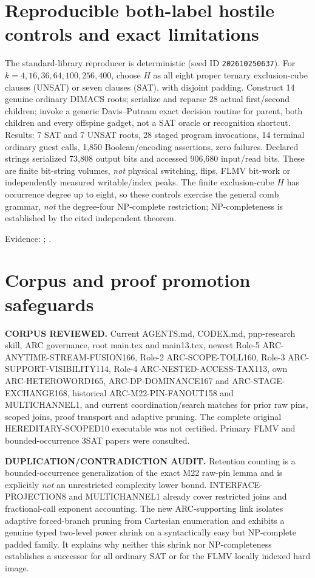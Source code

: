 \documentclass[11pt]{article}
\begin{document}
\section{Reproducible both-label hostile controls and exact limitations}
The standard-library reproducer is deterministic (seed ID \texttt{202610250637}). For $k=4,16,36,64,100,256,400$, choose $H$ as all eight proper ternary exclusion-cube clauses (UNSAT) or seven clauses (SAT), with disjoint padding. Construct 14 genuine ordinary DIMACS roots; serialize and reparse 28 actual first/second children; invoke a generic Davis--Putnam exact decision routine for parent, both children and every offspine gadget, not a SAT oracle or recognition shortcut. Results: 7 SAT and 7 UNSAT roots, 28 staged program invocations, 14 terminal ordinary guest calls, 1,850 Boolean/encoding assertions, zero failures. Declared strings serialized 73,808 output bits and accessed 906,680 input/read bits. These are finite bit-string volumes, \emph{not} physical switching, flips, FLMV bit-work or independently measured writable/index peaks. The finite exclusion-cube $H$ has occurrence degree up to eight, so these controls exercise the general comb grammar, \emph{not} the degree-four NP-complete restriction; NP-completeness is established by the cited independent theorem.

Evidence:
;
.

\section{Corpus and proof promotion safeguards}
\noindent\textbf{CORPUS REVIEWED.} Current AGENTS.md, CODEX.md, pnp-research skill, ARC governance, root main.tex and main13.tex, newest Role-5 ARC-ANYTIME-STREAM-FUSION166, Role-2 ARC-SCOPE-TOLL160, Role-3 ARC-SUPPORT-VISIBILITY114, Role-4 ARC-NESTED-ACCESS-TAX113, own ARC-HETEROWORD165, ARC-DP-DOMINANCE167 and ARC-STAGE-EXCHANGE168, historical ARC-M22-PIN-FANOUT158 and MULTICHANNEL1, and current coordination/search matches for prior raw pins, scoped joins, proof transport and adaptive pruning. The complete original HEREDITARY-SCOPED10 executable was not certified. Primary FLMV and bounded-occurrence 3SAT papers were consulted.

\noindent\textbf{DUPLICATION/CONTRADICTION AUDIT.} Retention counting is a bounded-occurrence generalization of the exact M22 raw-pin lemma and is explicitly \emph{not} an unrestricted complexity lower bound. INTERFACE-PROJECTION8 and MULTICHANNEL1 already cover restricted joins and fractional-call exponent accounting. The new ARC-supporting link isolates adaptive forced-branch pruning from Cartesian enumeration and exhibits a genuine typed two-level power shrink on a syntactically easy but NP-complete padded family. It explains why neither this shrink nor NP-completeness establishes a successor for all ordinary SAT or for the FLMV locally indexed hard image.
\end{document}

